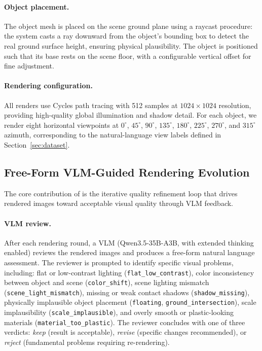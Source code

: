 \paragraph{Object placement.}
The object mesh is placed on the scene ground plane using a raycast procedure:
the system casts a ray downward from the object's bounding box to detect
the real ground surface height, ensuring physical plausibility.
The object is positioned such that its base rests on the scene floor,
with a configurable vertical offset for fine adjustment.

\paragraph{Rendering configuration.}
All renders use Cycles path tracing with 512 samples at $1024 \times 1024$ resolution,
providing high-quality global illumination and shadow detail.
For each object, we render eight horizontal viewpoints at
$0^\circ$, $45^\circ$, $90^\circ$, $135^\circ$, $180^\circ$, $225^\circ$, $270^\circ$, and $315^\circ$ azimuth,
corresponding to the natural-language view labels defined in Section~\ref{sec:dataset}.


\subsection{Free-Form VLM-Guided Rendering Evolution}
\label{sec:method:evolution}

The core contribution of \aris{} is the iterative quality refinement loop
that drives rendered images toward acceptable visual quality through VLM feedback.

\paragraph{VLM review.}
After each rendering round, a VLM (Qwen3.5-35B-A3B, with extended thinking enabled)
reviews the rendered images and produces a free-form natural language assessment.
The reviewer is prompted to identify specific visual problems,
including: flat or low-contrast lighting (\texttt{flat\_low\_contrast}),
color inconsistency between object and scene (\texttt{color\_shift}),
scene lighting mismatch (\texttt{scene\_light\_mismatch}),
missing or weak contact shadows (\texttt{shadow\_missing}),
physically implausible object placement (\texttt{floating}, \texttt{ground\_intersection}),
scale implausibility (\texttt{scale\_implausible}),
and overly smooth or plastic-looking materials (\texttt{material\_too\_plastic}).
The reviewer concludes with one of three verdicts:
\emph{keep} (result is acceptable), \emph{revise} (specific changes recommended),
or \emph{reject} (fundamental problems requiring re-rendering).

